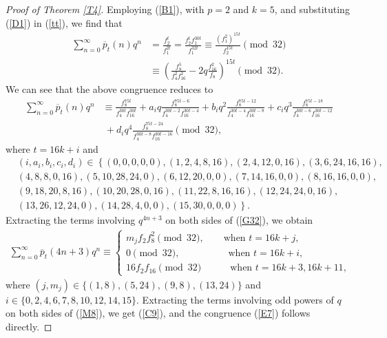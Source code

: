 \documentclass[12pt,reqno,a4paper]{amsart}
\newtheorem{theorem}{Theorem}[section]
\numberwithin{equation}{section}
\begin{document}
\begin{proof}[Proof of Theorem \ref{T4}] Employing (\ref{B1}), with $p=2$ and $k=5$, and substituting  (\ref{D1}) in (\ref{tt}), we find that
    \begin{align}
       \sum_{n=0}^\infty\overline{p}_{t}(n)q^n&=\frac{f_2^t}{f_1^{2t}}= \frac{f_2^tf_1^{30t}}{f_1^{32t}}\equiv \frac{(f_1^{2})^{15t}}{f_2^{15t}}\pmod{32}\nonumber\\
       & \equiv \left(\frac{f_8^5}{f_4^2f_{16}^2}-2q\frac{f_{16}^2}{f_8}\right)^{15t}\pmod{32}.
         \end{align}
  We can see that the above congruence reduces to
  \begin{align}
\label{G32} \sum_{n=0}^\infty\overline{p}_{t}(n)q^n&\equiv \frac{f_8^{75t}}{f_4^{30t}f_{16}^{30t}}+a_iq\frac{f_8^{75t-6}}{f_4^{30t-2}f_{16}^{30t-4}}+b_iq^2\frac{f_8^{75t-12}}{f_4^{30t-4}f_{16}^{30t-8}}+c_iq^3\frac{f_8^{75t-18}}{f_4^{30t-6}f_{16}^{30t-12}}\nonumber\\&~+d_iq^4\frac{f_8^{75t-24}}{f_4^{30t-8}f_{16}^{30t-16}} \pmod{32}, 
\end{align}
where $t=16k+i$ and
\begin{align*}
&(i, a_i, b_i, c_i, d_i)\in\left\{(0,0,0,0,0),(1,2,4,8,16),(2,4,12,0,16),(3,6,24,16,16),\right. \\
  &\left.(4,8,8,0,16),(5,10,28,24,0),(6,12,20,0,0),(7,14,16,0,0),(8,16,16,0,0),\right. \\
  &\left.(9,18,20,8,16),(10,20,28,0,16),(11,22,8,16,16),(12,24,24,0,16),\right.\\
   &\left.(13,26,12,24,0),(14,28,4,0,0),(15,30,0,0,0)\right\}.
\end{align*}
 Extracting the terms involving  $q^{4n+3}$  on both sides of (\ref{G32}), we obtain
     \begin{align}
   \label{M8}\sum_{n=0}^\infty\overline{p}_{t}(4n+3)q^n\equiv \begin{cases}
   m_jf_2f_{8}^2\pmod{32},\quad\quad \text{when $t=16k+j$,}\\
       0 \pmod{32},\qquad\quad\qquad \text{when $t=16k+i$,}\\
       16f_2f_{16}\pmod{32}\quad\qquad \text{when $t=16k+3,16k+11$},
   \end{cases}
\end{align}
where $(j,m_j)\in\{(1,8),(5,24),(9,8),(13,24)\}$ and $i\in\{0,2,4,6,7,8,10,12,14,15\}$.
 Extracting the terms involving odd powers of $q$ on both sides of (\ref{M8}), we get (\ref{C9}), and the congruence (\ref{E7}) follows directly.
\end{proof}
\end{document}
